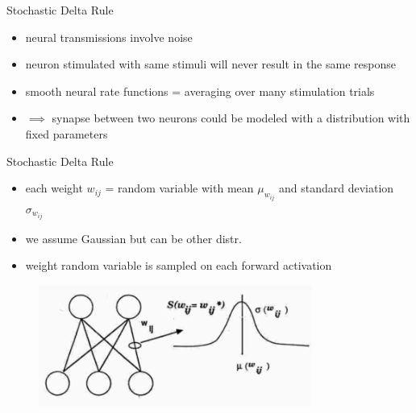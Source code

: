 \documentclass{beamer}
\begin{document}
\begin{frame}{Stochastic Delta Rule}

\begin{itemize}
\item neural transmissions involve noise
\item neuron stimulated with same stimuli will never result in the same response
\item smooth neural rate
functions = averaging over many stimulation trials
\item $\implies$ synapse between two neurons could be modeled with a distribution with fixed parameters
\end{itemize}

\end{frame}
\begin{frame}{Stochastic Delta Rule}

\begin{itemize}
\item each weight $w_{ij}$ = random variable with mean $\mu_{w_{ij}}$ and standard
deviation $\sigma_{w_{ij}}$
\item we assume Gaussian but can be other distr.
\item weight random variable is
sampled on each forward activation

\end{itemize}


\begin{figure}[h]
\includegraphics[width=0.8\textwidth]{img/sampling}
\end{figure}

\end{frame}
\end{document}
